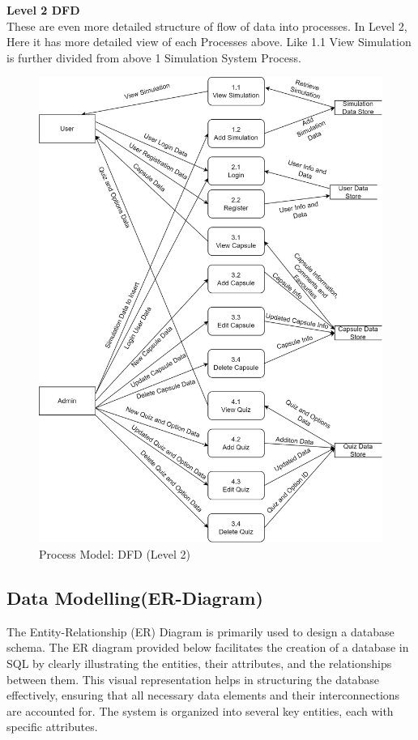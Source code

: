\newpage
\textbf{Level 2 DFD}\\
These are even more detailed structure of flow of data into processes. In Level 2, Here it has more detailed view of each Processes above. Like 1.1 View Simulation is further divided from above 1 Simulation System Process.
\begin{figure}[H]
    \centering
        \includegraphics[width = 15cm]{Diagrams/Process3.png}
    \caption{Process Model: DFD (Level 2)}
\end{figure}
\newpage
\subsection{Data Modelling(ER-Diagram)}
The Entity-Relationship (ER) Diagram is primarily used to design a database schema. The ER diagram provided below facilitates the creation of a database in SQL by clearly illustrating the entities, their attributes, and the relationships between them. This visual representation helps in structuring the database effectively, ensuring that all necessary data elements and their interconnections are accounted for.
The system is organized into several key entities, each with specific attributes. 
